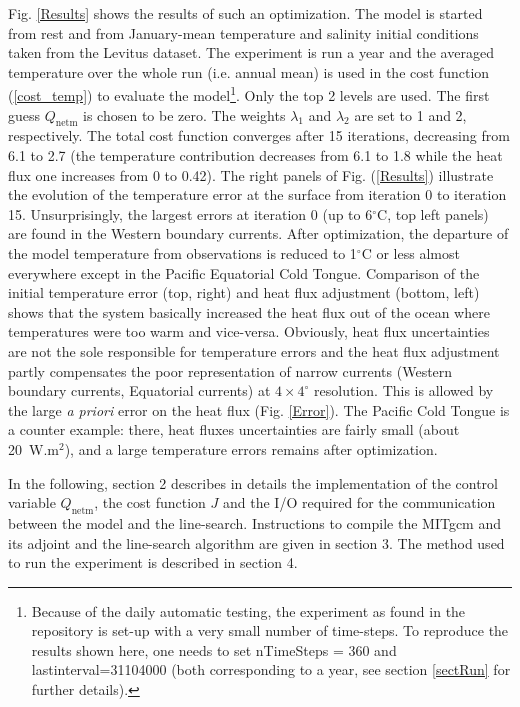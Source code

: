 Fig. \ref{Results} shows the results of such an optimization. The
model is started from rest and from January-mean temperature and salinity
initial conditions taken from the Levitus dataset. The experiment is run a year
and the averaged temperature over the whole run (i.e. annual mean) is used
in the cost function (\ref{cost_temp}) to evaluate the model\footnote{Because of
the daily automatic testing, the experiment as found in the repository is set-up
with a very small number of time-steps. To reproduce the results shown here, one
needs to set nTimeSteps = 360 and lastinterval=31104000 (both corresponding to a
year, see section \ref{sectRun} for further details).}. Only the
top 2 levels are used. The first guess $Q_\mathrm{netm}$ is chosen to be
zero. The weights $\lambda_1$ and $\lambda_2$ are set to 1 and 2, respectively.
The total cost function converges after 15 iterations, decreasing from 6.1 to
2.7 (the temperature contribution decreases from 6.1 to 1.8 while the heat
flux one increases from 0 to 0.42). The right panels of Fig. (\ref{Results})
illustrate the evolution of the temperature error at the surface from
iteration 0 to iteration 15. Unsurprisingly, the largest errors at iteration 0
(up to 6$^\circ$C, top left panels) are found in the Western boundary
currents. After optimization, the departure of the model temperature from
observations is reduced to 1$^\circ$C or less almost everywhere except in the
Pacific Equatorial Cold Tongue. Comparison of the initial temperature
error (top, right) and heat flux adjustment (bottom, left) shows that the
system basically increased the heat flux out of the ocean where temperatures
were too warm and vice-versa. Obviously, heat flux uncertainties are not the
sole responsible for temperature errors and the heat flux adjustment partly
compensates the poor representation of narrow currents (Western boundary
currents, Equatorial currents) at $4\times4^\circ$ resolution. This is
allowed by the large {\it a priori} error on the heat flux (Fig. \ref{Error}).
The Pacific Cold Tongue is a counter example: there, heat fluxes uncertainties
are fairly small (about 20~W.m$^2$), and a large temperature errors 
remains after optimization.

In the following, section 2 describes in details the implementation of the 
control variable $Q_\mathrm{netm}$, the cost function $J$ and the I/O required
for the communication between the model and the line-search. Instructions to
compile the MITgcm and its adjoint and the line-search algorithm are given in
section 3. The method used to run the experiment is described in section 4.

